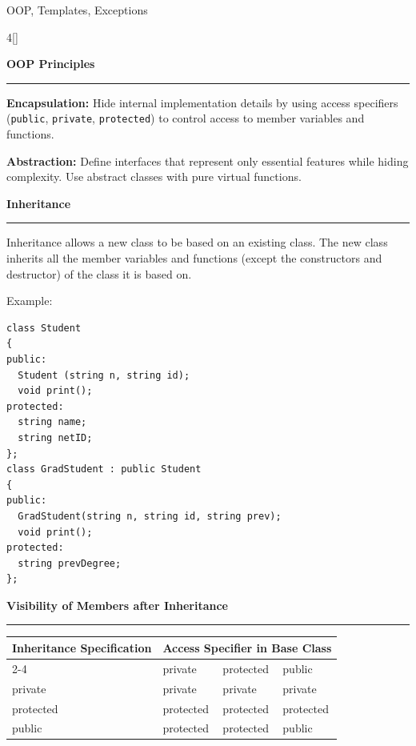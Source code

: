 \documentclass[final]{beamer}
\renewcommand{\subsection}[1]{%
  \par\vspace{1em}%
  {\noindent\large\bfseries #1\par}%
  \vspace{0.5em}\hrule\vspace{1em}%
}
\begin{document}
\begin{frame}[t,fragile]{OOP, Templates, Exceptions}

\setlength{\columnseprule}{0.4pt}  %

\begin{multicols}{4}[\setlength{\columnsep}{1.5cm}]



 \subsection{OOP Principles}
\textbf{Encapsulation:} Hide internal implementation details by using access specifiers (\texttt{public}, \texttt{private}, \texttt{protected}) to control access to member variables and functions.

\textbf{Abstraction:} Define interfaces that represent only essential features while hiding complexity. Use abstract classes with pure virtual functions.


 \subsection{Inheritance}
Inheritance allows a new class to be based on an existing class. The new class inherits all the member variables and functions (except the constructors and destructor) of the class it is based on.

Example:
\begin{lstlisting}
class Student
{
public:
  Student (string n, string id);
  void print();
protected:
  string name;
  string netID;
};
class GradStudent : public Student
{
public:
  GradStudent(string n, string id, string prev);
  void print();
protected:
  string prevDegree;
};
\end{lstlisting}

 \subsection{Visibility of Members after Inheritance}
\begin{tabular}{|l|l|l|l|}
\hline
\multirow{2}{*}{Inheritance Specification} & \multicolumn{3}{c|}{Access Specifier in Base Class} \\
\cline{2-4}
 & private & protected & public \\
\hline
private & private & private & private \\
\hline
protected & protected & protected & protected \\
\hline
public & protected & protected & public \\
\hline
\end{tabular}


\end{multicols}
\end{frame}
\end{document}
